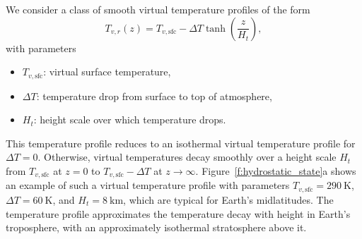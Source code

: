 \documentclass{report}
\begin{document}
We consider a class of smooth virtual temperature profiles of the form
\begin{equation}\label{e:ref_temperature}
    T_{v,r}(z) = T_{v, \mathrm{sfc}} - \Delta T \tanh\left(\frac{z}{H_{t}}\right),
\end{equation}
with parameters 
\begin{itemize}
    \item $T_{v, \mathrm{sfc}}$: virtual surface temperature, 
    \item $\Delta T$: temperature drop from surface to top of atmosphere,
    \item $H_{t}$: height scale over which temperature drops.
\end{itemize}
This temperature profile reduces to an isothermal virtual temperature profile for $\Delta T = 0$. Otherwise, virtual temperatures decay smoothly over a height scale $H_{t}$ from $T_{v, \mathrm{sfc}}$ at $z=0$ to $T_{v, \mathrm{sfc}} - \Delta T$ at $z\to \infty$. Figure~\ref{f:hydrostatic_state}a shows an example of such a virtual temperature profile with parameters $T_{v, \mathrm{sfc}} = 290~\mathrm{K}$, $\Delta T = 60~\mathrm{K}$, and $H_{t} = 8~\mathrm{km}$, which are typical for Earth's midlatitudes. The temperature profile approximates the temperature decay with height in Earth's troposphere, with an approximately isothermal stratosphere above it.
\end{document}
